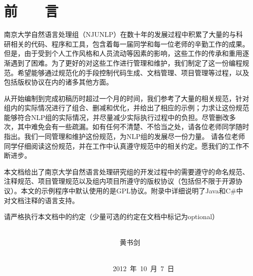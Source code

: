 
\chapter*{\hfill 前　　言 \hfill}
\label{chap00}

南京大学自然语言处理组（NJUNLP）在数十年的发展过程中积累了大量的与科研相关的代码、程序和工具，包含着每一届同学和每一位老师的辛勤工作的成果。但是，由于受到个人工作风格和人员流动等因素的影响，这些工作的传承和重用逐渐遇到了困难。为了更好的对这些工作进行管理和维护，我们制定了这一份编程规范。希望能够通过规范化的手段控制代码生成、文档管理、项目管理等过程，以及包括版权协议在内的诸多其他方面。

从开始编制到完成初稿历时超过一个月的时间，我们参考了大量的相关规范，针对组内的实际情况进行了组合、删减和优化，并给出了相应的示例；力求让这份规范能够符合NLP组的实际情况，并尽量减少实际执行过程中的负担。尽管删改多次，其中难免会有一些疏漏。如有任何不清楚、不恰当之处，请各位老师同学随时指出。我们一同管理和维护这份规范，为NLP组的发展尽一份力量。
请各位老师同学仔细阅读这份规范，并在工作中认真遵守规范中的相关约定。愿我们的工作不断进步。

本文档给出了南京大学自然语言处理研究组的开发过程中的需要遵守的命名规范、注释规范、项目管理规范以及组内项目所遵守的版权协议（包括但不限于开源协议）。本文的示例程序中默认使用的是GPL协议。附录中详细说明了Java和C\#中对文档注释的语言支持。

请严格执行本文档中的约定（少量可选的约定在文档中标记为optional）

~~~~~~~~~~~~~~~~~~~~~~~~~~~~~~~~~~~~~~~~~~~~~~~~~~~~~~~~~~~~~~~~~~~~~~~~~~~~~~~~~~~~~~~~~~~~~~~~~~~~~~~~~~黄书剑

~~~~~~~~~~~~~~~~~~~~~~~~~~~~~~~~~~~~~~~~~~~~~~~~~~~~~~~~~~~~~~~~~~~~~~~~~~~~~~~~~~~~~~~~~~~~~~~~~~~~~~~~2012~年~10~月~7~日
